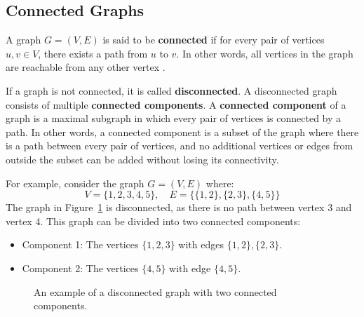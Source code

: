 \subsection{Connected Graphs}
A graph \( G = (V, E) \) is said to be \textbf{connected} if for every pair of vertices \( u, v \in V \), there exists a path from \( u \) to \( v \). In other words, all vertices in the graph are reachable from any other vertex \cite{yadav2023advanced, cormen2009introduction}.

If a graph is not connected, it is called \textbf{disconnected}. A disconnected graph consists of multiple \textbf{connected components}. A \textbf{connected component} of a graph is a maximal subgraph in which every pair of vertices is connected by a path. In other words, a connected component is a subset of the graph where there is a path between every pair of vertices, and no additional vertices or edges from outside the subset can be added without losing its connectivity.

For example, consider the graph \( G = (V, E) \) where:
\[
V = \{1, 2, 3, 4, 5\}, \quad E = \{\{1, 2\}, \{2, 3\}, \{4, 5\}\}
\]
The graph in Figure~\ref{fig:connected_graph} is disconnected, as there is no path between vertex 3 and vertex 4. This graph can be divided into two connected components:
\begin{itemize}
    \item Component 1: The vertices \( \{1, 2, 3\} \) with edges \( \{1, 2\}, \{2, 3\} \).
    \item Component 2: The vertices \( \{4, 5\} \) with edge \( \{4, 5\} \).
\end{itemize}

\begin{figure}[h]
\begin{center}
\caption{An example of a disconnected graph with two connected components.}
\label{fig:connected_graph}
\end{center}
\end{figure}

